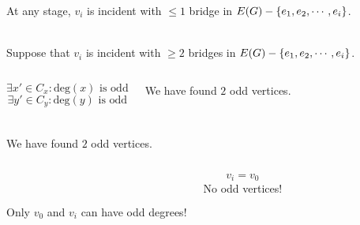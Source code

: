\begin{frame}{}
  \begin{theorem}
    At any stage, $v_i$ is incident with $\le 1$ bridge in $E(G) - \left\{e_1, e_2, \cdots, e_i\right\}$.
  \end{theorem}

  \pause
  \begin{center}
     \\[6pt]
    Suppose that $v_i$ is incident with $\ge 2$ bridges in $E(G) - \left\{e_1, e_2, \cdots, e_i\right\}$.
  \end{center}

  \pause
  \vspace{0.20cm}
  \begin{columns}
      
      \pause
      \[
	\exists x' \in C_x: \text{deg}(x) \text{ is odd}
      \]
      \pause
      \vspace{-0.60cm}
      \[
	\exists y' \in C_y: \text{deg}(y) \text{ is odd}
      \]

      \begin{center}
	\pause
	We have found $2$ odd vertices. \\[5pt]

	\pause
	 \\[8pt]

	\pause
      \end{center}
  \end{columns}
\end{frame}

\begin{frame}{}
  \begin{columns}
      
      \begin{center}
	We have found $2$ odd vertices. \\[5pt]

      \end{center}
    \end{columns}

  \pause
  \vspace{0.30cm}
  \begin{columns}
      \begin{center}
	 \\[8pt] \pause
	 \\[6pt] \pause
	Only $v_0$ and $v_i$ can have odd degrees!
      \end{center}
      \pause
      \pause
      \[
	v_i = v_0
      \]
      \pause
       \pause No odd vertices!
  \end{columns}
\end{frame}

